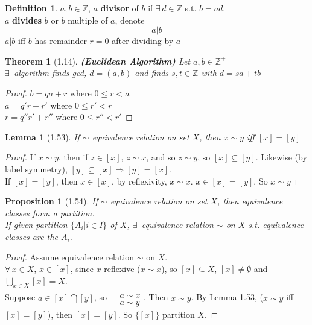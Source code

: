 \documentclass[twoside,landscape]{amsart}
\theoremstyle{plain}
\newtheorem{theorem}{Theorem}
\newtheorem{lemma}{Lemma}
\newtheorem{proposition}{Proposition}
\theoremstyle{definition}
\newtheorem{definition}{Definition}
\theoremstyle{remark}
\begin{document}
\begin{multicols*}{2}
\begin{definition}
  $a,b \in \mathbb{Z}$, $a$ \textbf{divisor} of $b$ if $\exists \, d \in \mathbb{Z}$ s.t. $b=ad$. \\
  $a$ \textbf{divides} $b$ or $b$ multiple of $a$, denote 
\[
a | b
\]
$a|b$ iff $b$ has remainder $r=0$ after dividing by $a$
\end{definition}

\begin{theorem}[1.14] \textbf{(Euclidean Algorithm)} Let $a,b \in \mathbb{Z}^+$ \\
$\exists \, $ algorithm finds gcd, $d= (a,b)$ and finds $s,t \in \mathbb{Z}$ with $d=sa + tb$
\end{theorem}

\begin{proof}
$b=qa + r$ where $0 \leq r < a$ \\
  $a=q'r + r' $ where $0\leq r' < r$ \\
$r=q''r' + r''$ where $0\leq r'' < r'$
\end{proof}


\begin{lemma}[1.53]
  If $\sim$ equivalence relation on set $X$, then $x\sim y$ iff $[x] = [y]$
\end{lemma}

\begin{proof}
  If $x\sim y$, then if $z\in [x]$, $z\sim x$, and so $z\sim y$, so $[x] \subseteq [y]$.  Likewise (by label symmetry), $[y] \subseteq [x] \Longrightarrow [y] = [x]$.  \\
If $[x]= [y]$, then $x\in [x]$, by reflexivity, $x \sim x$.  $x \in [x] = [y]$.  So $x\sim y$
\end{proof}

\begin{proposition}[1.54]
If $\sim $ equivalence relation on set $X$, then equivalence classes form a partition.  \\
If given partition $\lbrace A_i | i \in I \rbrace$ of $X$, $\exists \, $ equivalence relation $\sim $ on $X$ s.t. equivalence classes are the $A_i$.  
\end{proposition}

\begin{proof}
Assume equivalence relation $\sim$ on $X$.  \\
$\forall \, x \in X$, $x\in [x]$, since $x$ reflexive ($x\sim x$), so $[x] \subseteq X$, $[x] \neq \emptyset$ and $\bigcup_{x\in X} [x] = X$.  \\
Suppose $a \in [x] \bigcap [y]$, so $\begin{aligned} & \quad \\
  & a \sim x \\
  & a \sim y \end{aligned}$.  Then $x\sim y$.  By Lemma 1.53, ($x\sim y$ iff $[x]=[y]$), then $[x] = [y]$.  So $\lbrace [x] \rbrace$ partition $X$.  


\end{proof}
\end{multicols*}
\end{document}
